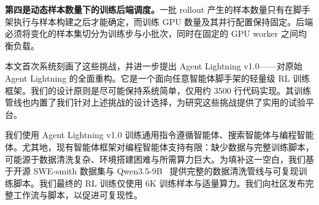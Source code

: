 \textbf{第四是动态样本数量下的训练后端调度。}一批 rollout 产生的样本数量只有在脚手架执行与样本构建之后才能确定，而训练 GPU 数量及其并行配置保持固定。后端必须将变化的样本集切分为训练步与小批次，同时在固定的 GPU worker 之间均衡负载。

本文首次系统刻画了这些挑战，并进一步提出 Agent Lightning v1.0——对原始 Agent Lightning 的全面重构。它是一个面向任意智能体脚手架的轻量级 RL 训练框架。我们的设计原则是尽可能保持系统简单，仅用约 3500 行代码实现。其训练管线也内置了我们针对上述挑战的设计选择，为研究这些挑战提供了实用的试验平台。

我们使用 Agent Lightning v1.0 训练通用指令遵循智能体、搜索智能体与编程智能体。尤其地，现有智能体框架对编程智能体支持有限：缺少数据与完整训练脚本，可能源于数据清洗复杂、环境搭建困难与所需算力巨大。为填补这一空白，我们基于开源 SWE-smith 数据集与 Qwen3.5-9B~\cite{qwen35} 提供完整的数据清洗管线与可复现训练脚本。我们最终的 RL 训练仅使用 6K 训练样本与适量算力。我们向社区发布完整工作流与脚本，以促进可复现性。
